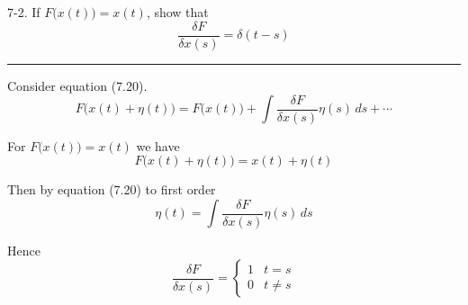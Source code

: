 \documentclass[12pt]{article}
\begin{document}
7-2.
If $F\big(x(t)\big)=x(t)$, show that
\begin{equation*}
\frac{\delta F}{\delta x(s)}=\delta(t-s)
\end{equation*}

\bigskip
\hrule

\bigskip
Consider equation (7.20).
\begin{equation*}
F\big(x(t)+\eta(t)\big)=F\big(x(t)\big)+\int\frac{\delta F}{\delta x(s)}\eta(s)\,ds+\cdots
\tag{7.20}
\end{equation*}

For $F\big(x(t)\big)=x(t)$ we have
\begin{equation*}
F\big(x(t)+\eta(t)\big)=x(t)+\eta(t)
\end{equation*}

Then by equation (7.20) to first order
\begin{equation*}
\eta(t)=\int\frac{\delta F}{\delta x(s)}\eta(s)\,ds
\end{equation*}

Hence
\begin{equation*}
\frac{\delta F}{\delta x(s)}=
\begin{cases}
1 & t=s
\\
0 & t\ne s
\end{cases}
\end{equation*}
\end{document}
